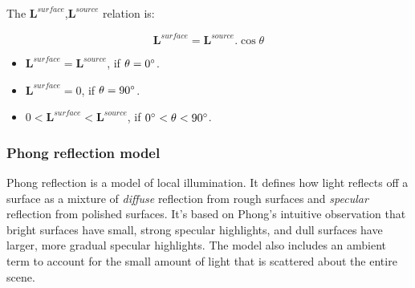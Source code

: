 \documentclass{article}
\begin{document}
	The  $\pmb{L}^{surface}$,$ \pmb{L}^{source}$ relation is:
	
	\begin{equation}
        \pmb{L}^{surface} = \pmb{L}^{source}.\cos \theta 
	\end{equation}


	\begin{itemize}
		\item $\pmb{L}^{surface} = \pmb{L}^{source}$, if $\theta = 0\degree$.
		\item $\pmb{L}^{surface} = 0$, if $\theta = 90\degree$.
		\item $0 < \pmb{L}^{surface} < \pmb{L}^{source}$, if $0\degree < \theta  < 90\degree$.
	\end{itemize}
	
	\subsubsection{Phong reflection model }
	Phong reflection is a model of local illumination. It defines how light reflects off a surface as a mixture of \textit{diffuse} reflection from rough surfaces and \textit{specular} reflection from polished surfaces. It's based on Phong's intuitive observation that bright surfaces have small, strong specular highlights, and dull surfaces have larger, more gradual specular highlights. The model also includes an ambient term to account for the small amount of light that is scattered about the entire scene.
	\\
	
\end{document}
